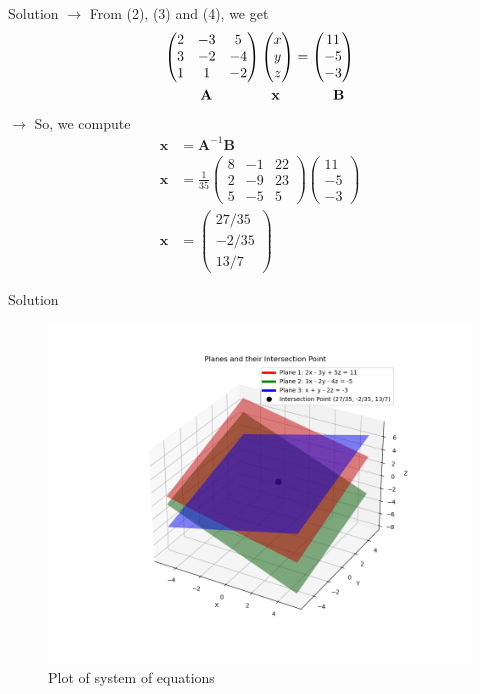 \documentclass{beamer}
\numberwithin{equation}{section}
\theoremstyle{remark}
\newcommand{\myvec}[1]{\ensuremath{\begin{pmatrix}#1\end{pmatrix}}}
\let\vec\mathbf
\begin{document}
\begin{frame}{Solution}
$\rightarrow$ From (2), (3) and (4), we get
\begin{align}
    \myvec{2&-3&5\\3&-2&-4\\1&1&-2} \myvec{x\\y\\z} &= \myvec{11\\-5\\-3} \\
    \vec{A}\hspace{1.5cm}\vec{x}\hspace{0.35cm} & \hspace{1cm}\vec{B} \notag
\end{align}
$\rightarrow$ So, we compute
\begin{align}
    \vec{x} &= \vec{A}^{-1} \vec{B} \\
    \vec{x} &= \frac{1}{35}\myvec{8&-1&22\\2&-9&23\\5&-5&5}\myvec{11\\-5\\-3} \\
    \vec{x} &= \myvec{27/35\\-2/35\\13/7}
\end{align}
\end{frame}

\begin{frame}{Solution}
\begin{figure}[h!]
   \centering
   \includegraphics[width=0.8\linewidth]{figs/01.png}
   \caption{Plot of system of equations}
   \label{Plot_1}
\end{figure}
\end{frame}
\end{document}
